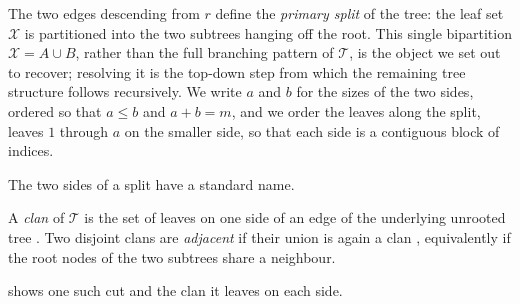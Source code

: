 The two edges descending from $r$ define the \emph{primary split} of the tree: the
leaf set $\mathcal{X}$ is partitioned into the two subtrees hanging off the root.
This single bipartition $\mathcal{X} = A \cup B$, rather than the full branching
pattern of $\mathcal{T}$, is the object we set out to recover; resolving it is the
top-down step from which the remaining tree structure follows recursively. We write
$a$ and $b$ for the sizes of the two sides, ordered so that $a \le b$ and
$a + b = m$, and we order the leaves along the split, leaves $1$ through $a$ on the
smaller side, so that each side is a contiguous block of indices.

The two sides of a split have a standard name.

\begin{definition}\label{def:clan}
A \emph{clan} of $\mathcal{T}$ is the set of leaves on one side of an edge of the
underlying unrooted tree \cite{wilkinson2007clades, semple2003phylogenetics}. Two
disjoint clans are \emph{adjacent} if their union is again a clan
\cite{aizenbud2023spectral}, equivalently if the root nodes of the two subtrees
share a neighbour.
\end{definition}

\noindent {} shows one such cut and the clan it leaves on
each side.


